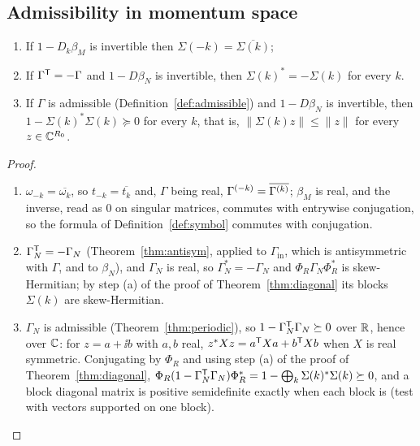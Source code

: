 \subsection{Admissibility in momentum space}
\begin{theorem}\label{thm:blocks}
\begin{enumerate}
\item[(a)] If $1-D_k\beta_M$ is invertible then $\Sigma(-k)=\overline{\Sigma(k)}$;
\item[(b)] If $\Gamma^{\mathsf T}=-\Gamma$ and $1-D\beta_N$ is invertible, then
$\Sigma(k)^*=-\Sigma(k)$ for every $k$.
\item[(c)] If $\Gamma$ is admissible (Definition~\ref{def:admissible}) and $1-D\beta_N$
is invertible, then $1-\Sigma(k)^*\Sigma(k)\succeq0$ for every $k$, that is,
$\|\Sigma(k)z\|\leq\|z\|$ for every $z\in\mathbb C^{R_0}$.
\end{enumerate}
\end{theorem}
\begin{proof}
\begin{enumerate}
\item[(a)] $\omega_{-k}=\overline{\omega_k}$, so $t_{-k}=\overline{t_k}$ and, $\Gamma$
being real, $\Gamma^{(-k)}=\overline{\Gamma^{(k)}}$; $\beta_M$ is real, and the inverse, read as
$0$ on singular matrices, commutes with entrywise conjugation, so
the formula of Definition~\ref{def:symbol} commutes with conjugation.
\item[(b)] $\Gamma_N^{\mathsf T}=-\Gamma_N$ (Theorem~\ref{thm:antisym}, applied to
$\Gamma_{\mathrm{in}}$, which is antisymmetric with $\Gamma$, and to $\beta_N$), and
$\Gamma_N$ is real, so $\Gamma_N^*=-\Gamma_N$ and $\Phi_R\Gamma_N\Phi_R^*$ is skew-Hermitian;
by step (a) of the proof of Theorem~\ref{thm:diagonal} its blocks $\Sigma(k)$ are skew-Hermitian.
\item[(c)] $\Gamma_N$ is admissible (Theorem~\ref{thm:periodic}), so
$1-\Gamma_N^{\mathsf T}\Gamma_N\succeq0$ over $\mathbb R$, hence over $\mathbb C$: for $z=a+\ii b$ with $a,b$
real, $z^*Xz=a^{\mathsf T}Xa+b^{\mathsf T}Xb$ when $X$ is real symmetric. Conjugating by $\Phi_R$ and
using step (a) of the proof of Theorem~\ref{thm:diagonal},
$\Phi_R(1-\Gamma_N^{\mathsf T}\Gamma_N)\Phi_R^*=1-\bigoplus_k\Sigma(k)^*\Sigma(k)\succeq0$, and a
block diagonal matrix is positive semidefinite exactly when each block is (test with
vectors supported on one block). \qedhere
\end{enumerate}
\end{proof}
